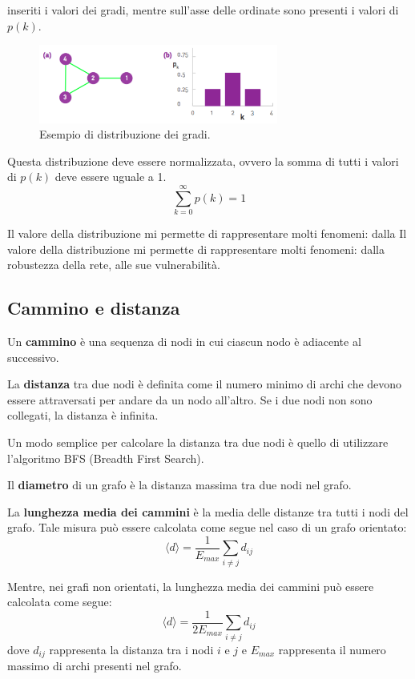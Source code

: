 inseriti i valori dei gradi, mentre sull'asse delle ordinate sono presenti i
valori di $p(k)$.
\begin{figure}[!ht]
    \centering
    \includegraphics[width=0.7\textwidth]{./img/net/degreedist.png}
    \caption{Esempio di distribuzione dei gradi.}
    \label{fig:degree_distribution}
\end{figure}
\begin{nota}
    Questa distribuzione deve essere normalizzata, ovvero la somma di tutti i
    valori di $p(k)$ deve essere uguale a 1.
    \begin{equation*}
        \sum_{k=0}^{\infty} p(k) = 1
    \end{equation*}
\end{nota}
Il valore della distribuzione mi permette di rappresentare molti fenomeni: dalla
Il valore della distribuzione mi permette di rappresentare molti fenomeni: dalla
robustezza della rete, alle sue vulnerabilità.
\subsection{Cammino e distanza}
\begin{definizione}
    Un \textbf{cammino} è una sequenza di nodi in cui ciascun nodo è adiacente
    al successivo.
\end{definizione}
\begin{definizione}
    La \textbf{distanza} tra due nodi è definita come il numero minimo di archi
    che devono essere attraversati per andare da un nodo all'altro. Se i due
    nodi non sono collegati, la distanza è infinita.
\end{definizione}
Un modo semplice per calcolare la distanza tra due nodi è quello di utilizzare
l'algoritmo BFS (Breadth First Search).
\begin{definizione}
    Il \textbf{diametro} di un grafo è la distanza massima tra due nodi nel grafo.
\end{definizione}
\begin{definizione}
    La \textbf{lunghezza media dei cammini} è la media delle distanze tra tutti 
    i nodi del grafo. Tale misura può essere calcolata come segue nel caso di 
    un grafo orientato:
    \begin{equation}
        \langle d \rangle = \frac{1}{E_{max}} \sum_{i \neq j} d_{ij}
    \end{equation}
\end{definizione}
Mentre, nei grafi non orientati, la lunghezza media dei cammini può essere calcolata
come segue:
\begin{equation}
    \langle d \rangle = \frac{1}{2E_{max}} \sum_{i \neq j} d_{ij}
\end{equation}
dove $d_{ij}$ rappresenta la distanza tra i nodi $i$ e $j$ e $E_{max}$ rappresenta
il numero massimo di archi presenti nel grafo.
